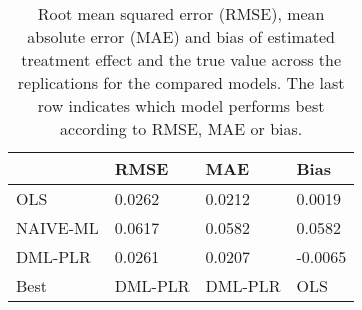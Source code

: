 \begin{table}[H]
\centering
\caption{Root mean squared error (RMSE), mean absolute error (MAE) and bias of estimated treatment effect and the true value across the replications for the compared models. The last row indicates which model performs best according to RMSE, MAE or bias.}
\label{Scenario1}
\begin{tabular}{L{3.3333333333333335cm}L{2.6666666666666665cm}R{2.0cm}R{2.6666666666666665cm}}
\toprule
 & RMSE & MAE & Bias \\
\midrule
OLS & 0.0262 & 0.0212 & 0.0019 \\
NAIVE-ML & 0.0617 & 0.0582 & 0.0582 \\
DML-PLR & 0.0261 & 0.0207 & -0.0065 \\
Best & DML-PLR & DML-PLR & OLS \\
\bottomrule
\end{tabular}
\end{table}
